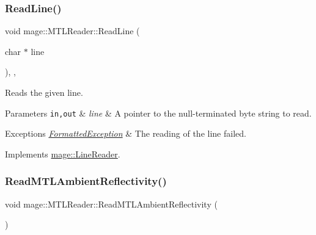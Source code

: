\subsubsection{\texorpdfstring{Read\+Line()}{ReadLine()}}
{\footnotesize\ttfamily void mage\+::\+M\+T\+L\+Reader\+::\+Read\+Line (\begin{DoxyParamCaption}\item[{char $\ast$}]{line }\end{DoxyParamCaption})\hspace{0.3cm}{\ttfamily [override]}, {\ttfamily [private]}, {\ttfamily [virtual]}}

Reads the given line.


\begin{DoxyParams}[1]{Parameters}
\mbox{\tt in,out}  & {\em line} & A pointer to the null-\/terminated byte string to read. \\
\hline
\end{DoxyParams}

\begin{DoxyExceptions}{Exceptions}
{\em \hyperlink{structmage_1_1_formatted_exception}{Formatted\+Exception}} & The reading of the line failed. \\
\hline
\end{DoxyExceptions}


Implements \hyperlink{classmage_1_1_line_reader_acfb2f7279ec77d070a86d7db812d4745}{mage\+::\+Line\+Reader}.

\hypertarget{classmage_1_1_m_t_l_reader_a7137e998979a79fe258f226bfbda669e}{}\label{classmage_1_1_m_t_l_reader_a7137e998979a79fe258f226bfbda669e} 
\subsubsection{\texorpdfstring{Read\+M\+T\+L\+Ambient\+Reflectivity()}{ReadMTLAmbientReflectivity()}}
{\footnotesize\ttfamily void mage\+::\+M\+T\+L\+Reader\+::\+Read\+M\+T\+L\+Ambient\+Reflectivity (\begin{DoxyParamCaption}{ }\end{DoxyParamCaption})\hspace{0.3cm}{\ttfamily [private]}}

\hypertarget{classmage_1_1_m_t_l_reader_ae5fa12979b84a5880bf560b43d495305}{}\label{classmage_1_1_m_t_l_reader_ae5fa12979b84a5880bf560b43d495305} 
